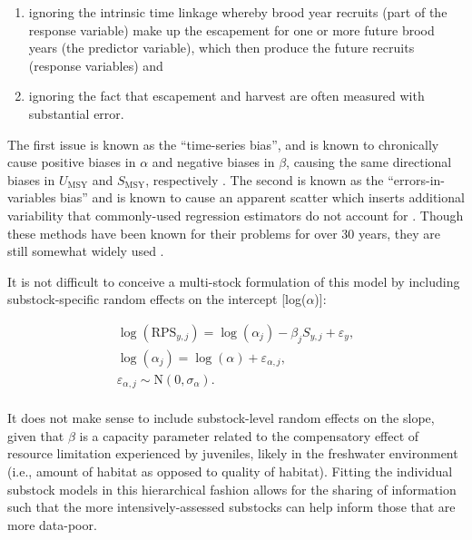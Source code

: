 \documentclass[12pt,]{book}
\theoremstyle{definition}
\theoremstyle{definition}
\theoremstyle{definition}
\theoremstyle{remark}
\begin{document}
\begin{enumerate}
\def\labelenumi{(\arabic{enumi})}
\item
  ignoring the intrinsic time linkage whereby brood year recruits (part
  of the response variable) make up the escapement for one or more
  future brood years (the predictor variable), which then produce the
  future recruits (response variables) and
\item
  ignoring the fact that escapement and harvest are often measured with
  substantial error.
\end{enumerate}

\noindent
The first issue is known as the ``time-series bias'', and is known to
chronically cause positive biases in \(\alpha\) and negative biases in
\(\beta\), causing the same directional biases in \(U_{\text{MSY}}\) and
\(S_{\text{MSY}}\), respectively \citep[i.e., spuriously providing too
aggressive harvest policy recommendations;][]{walters-1985}. The second
is known as the ``errors-in-variables bias'' and is known to cause an
apparent scatter which inserts additional variability that commonly-used
regression estimators do not account for \citep{ludwig-walters-1981}.
Though these methods have been known for their problems for over 30
years, they are still somewhat widely used \citep{korman-english-2013}.

It is not difficult to conceive a multi-stock formulation of this model
by including substock-specific random effects on the intercept
{[}log(\(\alpha\)){]}:

\begin{equation}
  \begin{split}
    \log(\text{RPS}_{y,j})=\log(\alpha_j)-\beta_j S_{y,j} + \varepsilon_y, \\
    \log(\alpha_j)=\log(\alpha) + \varepsilon_{\alpha,j}, \\
    \varepsilon_{\alpha,j} \sim \text{N}(0,\sigma_{\alpha}). \\
  \end{split}
\label{eq:lin-ricker-mixed}
\end{equation}

\noindent
It does not make sense to include substock-level random effects on the
slope, given that \(\beta\) is a capacity parameter related to the
compensatory effect of resource limitation experienced by juveniles,
likely in the freshwater environment (i.e., amount of habitat as opposed
to quality of habitat). Fitting the individual substock models in this
hierarchical fashion allows for the sharing of information such that the
more intensively-assessed substocks can help inform those that are more
data-poor.
\end{document}
